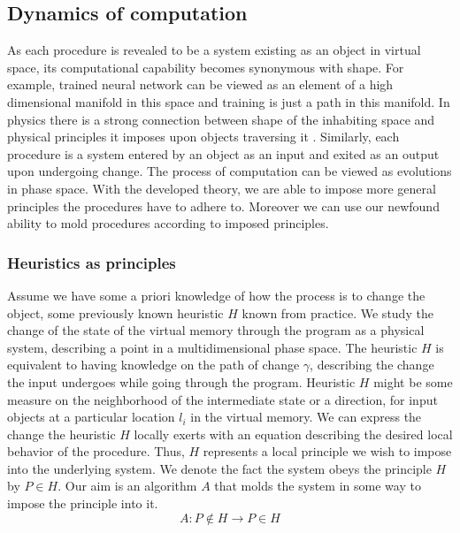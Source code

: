 \documentclass{article}
\begin{document}
\subsection{Dynamics of computation}

As each procedure is revealed to be a system existing as an object in virtual space, its computational capability becomes synonymous with shape. For example, trained neural network can be viewed as an element of a high dimensional manifold in this space and training is just a path in this manifold.
In physics there is a strong connection between shape of the inhabiting space and physical principles it imposes upon objects traversing it \cite{GeneralCovariance}. Similarly, each procedure is a system entered by an object as an input and exited as an output upon undergoing change. The process of computation can be viewed as evolutions in phase space.
With the developed theory, we are able to impose more general principles the procedures have to adhere to. Moreover we can use our newfound ability to mold procedures according to imposed principles.

\subsubsection{Heuristics as principles}
 
 Assume we have some a priori knowledge of how the process is to change the object, some previously known heuristic $H$ known from practice. We study the change of the state of the virtual memory through the program as a physical system, describing a point in a multidimensional phase space. %
 The heuristic $H$ is equivalent to having knowledge on the path of change $\gamma$, describing the change the input undergoes while going through the program. Heuristic $H$ might be some measure on the neighborhood of the intermediate state or a direction, for input objects at a particular location $l_i$ in the virtual memory. We can express the change the heuristic $H$ locally exerts with an equation describing the desired local behavior of the procedure. 
Thus, $H$ represents a local principle we wish to impose into the underlying system. We denote the fact the system obeys the principle $H$ by $P\in H$. Our aim is an algorithm $A$ that molds the system in some way to impose the principle into it.
\begin{equation}\label{eq:impose}
A:P\notin H\to P\in H
\end{equation}
\end{document}

